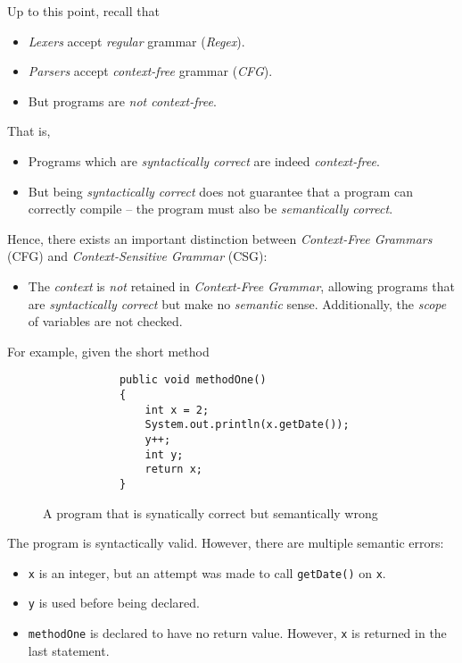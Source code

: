 \begin{remark}
    Up to this point, recall that
    \begin{itemize}
        \item \textit{Lexers} accept \textit{regular} grammar (\textit{Regex}).
        \item \textit{Parsers} accept \textit{context-free} grammar (\textit{CFG}).
        \item But programs are \textit{not context-free}.
    \end{itemize}
    
    That is,
    \begin{itemize}
        \item Programs which are \textit{syntactically correct} are indeed \textit{context-free}.
        \item But being \textit{syntactically correct} does not guarantee that a program can correctly compile -- the program must also be \textit{semantically correct}.
    \end{itemize}
    
    Hence, there exists an important distinction between \textit{Context-Free Grammars} (CFG) and \textit{Context-Sensitive Grammar} (CSG):
    
    \begin{itemize}
        \item The \textit{context} is \textit{not} retained in \textit{Context-Free Grammar}, allowing programs that are \textit{syntactically correct} but make no \textit{semantic} sense. Additionally, the \textit{scope} of variables are not checked.
    \end{itemize}
\end{remark}

\begin{example}
    For example, given the short method
    \begin{figure}[H]
        \centering
        \begin{verbatim}
            public void methodOne()
            {
                int x = 2;
                System.out.println(x.getDate());
                y++;
                int y;
                return x;
            }
        \end{verbatim}
        \caption{A program that is synatically correct but semantically wrong}
        \label{prog:syntactically-correct-semantically-wrong}
    \end{figure}
    
    The program is syntactically valid. However, there are multiple semantic errors:
    \begin{itemize}
        \item \texttt{x} is an integer, but an attempt was made to call \texttt{getDate()} on \texttt{x}.
        \item \texttt{y} is used before being declared.
        \item \texttt{methodOne} is declared to have no return value. However, \texttt{x} is returned in the last statement.
    \end{itemize}
\end{example}

